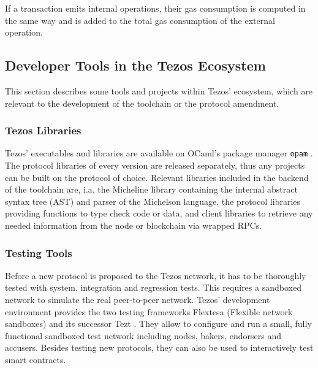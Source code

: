 If a transaction emits internal operations, their gas consumption is computed in the same way and is added to the total gas consumption of the external operation.

\subsection{Developer Tools in the Tezos Ecosystem}
This section describes some tools and projects within Tezos' ecosystem, which are relevant to the development of the toolchain or the protocol amendment.

\subsubsection{Tezos Libraries}
Tezos' executables and libraries are available on OCaml's package manager \texttt{opam} \cite{tezos_opam}. The protocol libraries of every version are released separately, thus any projects can be built on the protocol of choice. Relevant libraries included in the backend of the toolchain are, i.a, the Micheline library containing the internal abstract syntax tree (AST) and parser of the Michelson language, the protocol libraries providing functions to type check code or data, and client libraries to retrieve any needed information from the node or blockchain via wrapped RPCs.

\subsubsection{Testing Tools}
Before a new protocol is proposed to the Tezos network, it has to be thoroughly tested with system, integration and regression tests. This requires a sandboxed network to simulate the real peer-to-peer network. Tezos' development environment provides the two testing frameworks Flextesa (Flexible network sandboxes)\cite{tezos_docs} and its successor Tezt \cite{tezos_docs}. They allow to configure and run a small, fully functional sandboxed test network including nodes, bakers, endorsers and accusers. Besides testing new protocols, they can also be used to interactively test smart contracts.

